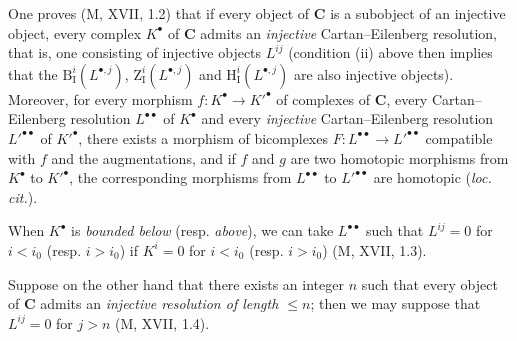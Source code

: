 \begin{env}[11.4.2]
One proves (M, XVII, 1.2) that if every object of $\boldsymbol{C}$ is a subobject
of an injective object, every complex $K^\bullet$ of $\boldsymbol{C}$ admits an
\emph{injective} Cartan--Eilenberg resolution, that is, one consisting of
injective objects $L^{ij}$ (condition (ii) above then implies that the
$\mathrm B_{\mathrm I}^i(L^{\bullet,j})$,
$\mathrm Z_{\mathrm I}^i(L^{\bullet,j})$ and
$\mathrm H_{\mathrm I}^i(L^{\bullet,j})$ are also injective objects).
Moreover, for every morphism $f:K^\bullet\to K'^\bullet$ of complexes of
$\boldsymbol{C}$, every Cartan--Eilenberg resolution $L^{\bullet\bullet}$ of
$K^\bullet$ and every \emph{injective} Cartan--Eilenberg resolution
$L'^{\bullet\bullet}$ of $K'^\bullet$, there exists a morphism of bicomplexes
$F:L^{\bullet\bullet}\to L'^{\bullet\bullet}$ compatible with $f$ and the
augmentations, and if $f$ and $g$ are two homotopic morphisms from $K^\bullet$
to $K'^\bullet$, the corresponding morphisms from $L^{\bullet\bullet}$
to $L'^{\bullet\bullet}$ are homotopic (\emph{loc. cit.}).

When $K^\bullet$ is \emph{bounded below} (resp.
\emph{above}), we can take $L^{\bullet\bullet}$ such that
$L^{ij}=0$ for $i<i_0$ (resp. $i>i_0$) if $K^i=0$ for $i<i_0$ (resp.
$i>i_0$) (M, XVII, 1.3).

Suppose on the other hand that there exists an integer $n$ such that every object of
$\boldsymbol{C}$ admits an \emph{injective resolution of length $\leq n$};
then we may suppose that $L^{ij}=0$ for $j>n$ (M, XVII, 1.4).
\end{env}

